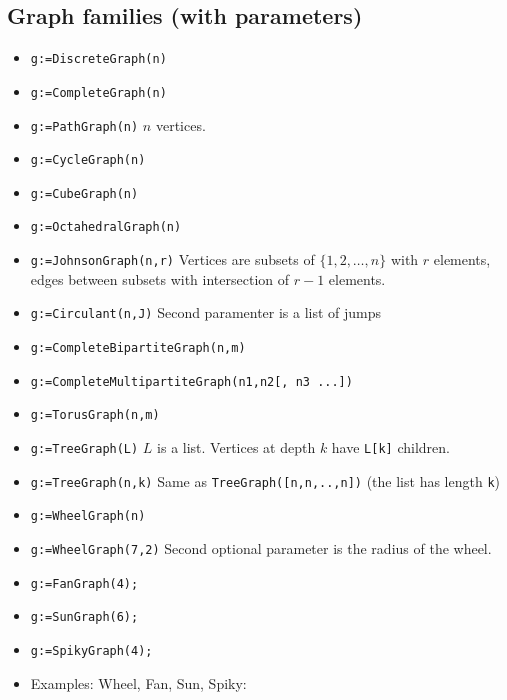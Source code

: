 \documentclass[11pt]{article}
\begin{document}
\begin{multicols}{3}
\section{Graph families (with parameters)}
\label{sec:org7a55599}

\begin{itemize}
\item \texttt{g:=DiscreteGraph(n)}
\item \texttt{g:=CompleteGraph(n)}
\item \texttt{g:=PathGraph(n)} \(n\) vertices.
\item \texttt{g:=CycleGraph(n)}
\item \texttt{g:=CubeGraph(n)}
\item \texttt{g:=OctahedralGraph(n)}
\item \texttt{g:=JohnsonGraph(n,r)} Vertices are subsets of \(\{1,2,\ldots,n\}\)
with \(r\) elements, edges between subsets with intersection of
\(r-1\) elements.
\item \texttt{g:=Circulant(n,J)} Second paramenter is a list of jumps
\item \texttt{g:=CompleteBipartiteGraph(n,m)}
\item \texttt{g:=CompleteMultipartiteGraph(n1,n2[, n3 ...])}
\item \texttt{g:=TorusGraph(n,m)}
\item \texttt{g:=TreeGraph(L)} \(L\) is a list. Vertices at depth \(k\) have
\texttt{L[k]} children.
\item \texttt{g:=TreeGraph(n,k)} Same as \texttt{TreeGraph([n,n,..,n])} (the list has
length \texttt{k})
\item \texttt{g:=WheelGraph(n)}
\item \texttt{g:=WheelGraph(7,2)} Second optional parameter is the radius of the
wheel.
\item \texttt{g:=FanGraph(4);}
\item \texttt{g:=SunGraph(6);}
\item \texttt{g:=SpikyGraph(4);}
\item Examples: Wheel, Fan, Sun, Spiky:


\end{itemize}
\end{multicols}
\end{document}
